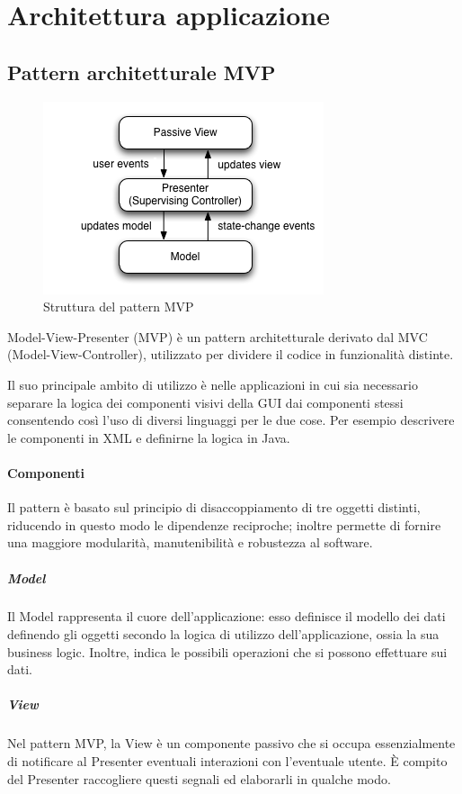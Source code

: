 \documentclass[../ManualeSviluppatore.tex]{subfiles}
\begin{document}
\section{Architettura applicazione}

	\subsection{Pattern architetturale MVP}
	\begin{figure}[!h]
		\centering
		\includegraphics[scale=0.6]{img/mvp}
			\caption{Struttura del pattern MVP}
		\label{fig:StrutturaMVP}
	\end{figure}
	
			Model-View-Presenter (MVP) è un pattern architetturale derivato dal MVC (Model-View-Controller), utilizzato per dividere il codice in funzionalità distinte. 
			
			Il suo principale ambito di utilizzo è nelle applicazioni in cui sia necessario separare la logica dei componenti visivi della GUI dai componenti stessi consentendo così l'uso di diversi linguaggi per le due cose. Per esempio  descrivere le componenti in XML e definirne la logica in Java.
			
			\paragraph{Componenti}
			Il pattern è basato sul principio di disaccoppiamento di tre oggetti distinti, riducendo in questo modo le dipendenze reciproche; inoltre permette di fornire una maggiore modularità, manutenibilità e robustezza al software.
				\subparagraph*{Model}
					Il Model rappresenta il cuore dell'applicazione: esso definisce il modello dei dati definendo gli oggetti secondo la logica di utilizzo dell'applicazione, ossia la sua business logic. Inoltre, indica le possibili operazioni che si possono effettuare sui dati.
					
				\subparagraph*{View}
					Nel pattern MVP, la View è un componente passivo che si occupa essenzialmente di notificare al Presenter eventuali interazioni con l'eventuale utente. È compito del Presenter raccogliere questi segnali ed elaborarli in qualche modo.
					
\end{document}

